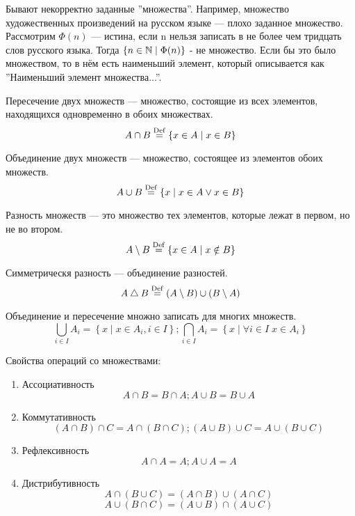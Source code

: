 Бывают некорректно заданные ''множества''. Например, множество художественных произведений на русском языке --- плохо заданное множество. Рассмотрим 
$\Phi(n)$ --- истина, если n нельзя записать в не более чем тридцать слов русского языка. Тогда
$\left\{n \in \mathbb{N} \mid \Phi(n)\right\}$ - не множество. Если бы это было множеством, то в нём есть наименьший элемент, 
который описывается как ''Наименьший элемент множества...''.

\begin{Def}
Пересечение двух множеств --- множество, состоящие из всех элементов, находящихся одновременно в обоих множествах.
$$ A \cap B \stackrel{\mathrm{Def}}{=} \left\{x \in A \mid x \in B \right\} $$
\end{Def}
\begin{Def}
Объединение двух множеств --- множество, состоящее из элементов обоих множеств.
$$ A \cup B \stackrel{\mathrm{Def}}{=} \left\{x \mid x \in A \lor x \in B \right\} $$
\end{Def}
\begin{Def}
Разность множеств --- это множество тех элементов, которые лежат в первом, но не во втором.
$$ A \setminus B \stackrel{\mathrm{Def}}{=} \left\{ x \in A \mid x \notin B \right\}$$
\end{Def}
\begin{Def}
Симметрическя разность --- объединение разностей.
$$ A \bigtriangleup B \stackrel{\mathrm{Def}}{=} \left(A \setminus B\right) \cup \left(B \setminus A\right) $$
\end{Def}

Объединение и пересечение множно записать для многих множеств.
$$ \bigcup_{i \in I} A_i = \left\{x \mid x \in A_i, i \in I\right\}; 
\bigcap_{i \in I} A_i = \left\{x \mid \forall i \in I\; x \in A_i \right\} $$

Свойства операций со множествами:
\begin{enumerate}
\item Ассоциативность
$$ A \cap B = B \cap A; A \cup B = B \cup A $$
\item Коммутативность
$$ \left(A \cap B \right) \cap C = A \cap \left(B \cap C \right); \left(A \cup B \right) \cup C = A \cup \left(B \cup C \right) $$
\item Рефлексивность
$$ A \cap A = A; A \cup A = A $$
\item Дистрибутивность
$$ A \cap \left(B \cup C \right) = \left(A \cap B\right) \cup \left(A \cap C \right) $$
$$ A \cup \left(B \cap C \right) = \left(A \cup B\right) \cap \left(A \cup C \right) $$
\end{enumerate}

